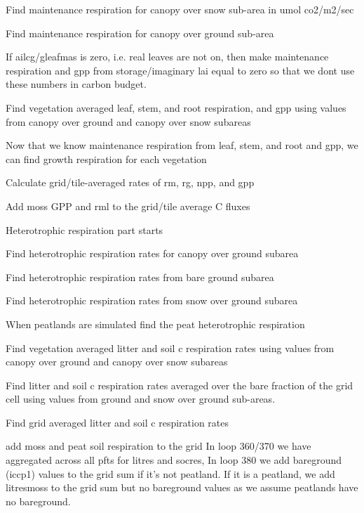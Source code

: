 Find maintenance respiration for canopy over snow sub-\/area in umol co2/m2/sec

Find maintenance respiration for canopy over ground sub-\/area

If ailcg/gleafmas is zero, i.\+e. real leaves are not on, then make maintenance respiration and gpp from storage/imaginary lai equal to zero so that we don\textquotesingle{}t use these numbers in carbon budget.

Find vegetation averaged leaf, stem, and root respiration, and gpp using values from canopy over ground and canopy over snow subareas

Now that we know maintenance respiration from leaf, stem, and root and gpp, we can find growth respiration for each vegetation

Calculate grid/tile-\/averaged rates of rm, rg, npp, and gpp \begin{DoxyVerb}Add moss GPP and rml to the grid/tile average C fluxes \end{DoxyVerb}


\begin{DoxyVerb} Heterotrophic respiration part starts \end{DoxyVerb}


Find heterotrophic respiration rates for canopy over ground subarea

Find heterotrophic respiration rates from bare ground subarea

Find heterotrophic respiration rates from snow over ground subarea

When peatlands are simulated find the peat heterotrophic respiration

Find vegetation averaged litter and soil c respiration rates using values from canopy over ground and canopy over snow subareas

Find litter and soil c respiration rates averaged over the bare fraction of the grid cell using values from ground and snow over ground sub-\/areas.

Find grid averaged litter and soil c respiration rates

\begin{DoxyVerb}add moss and peat soil respiration to the grid
In loop 360/370 we have aggregated across all pfts for litres and socres, In loop 380 we add
bareground (iccp1) values to the grid sum if it's not peatland. If it is a peatland, we add litresmoss to
the grid sum but no bareground values as we assume peatlands have no bareground. \end{DoxyVerb}


